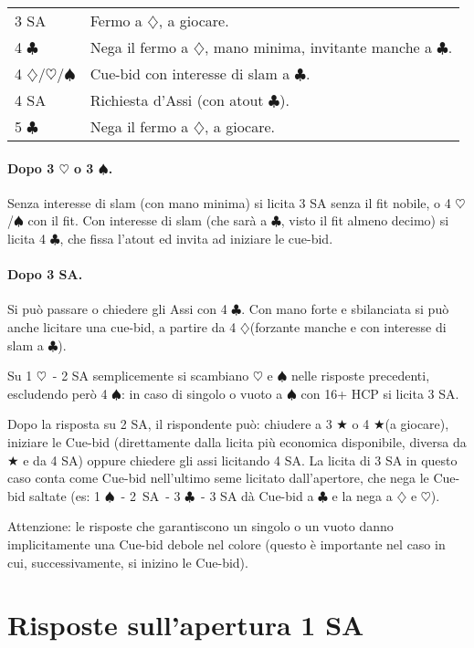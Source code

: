 \documentclass[a4paper,10pt]{article}
\renewcommand{\c}{$\clubsuit$\xspace}
\renewcommand{\d}{$\diamondsuit$\xspace}
\newcommand{\h}{$\heartsuit$\xspace}
\newcommand{\s}{$\spadesuit$\xspace}
\renewcommand{\j}{$\bigstar$\xspace}
\newcommand{\sa}{SA\xspace}
\newcommand{\smallspace}{\vskip0.3cm}
\newenvironment{twocol}
  {\smallspace\noindent\begin{tabular}{l p{0.78\textwidth}}}
  {\end{tabular}\smallspace}
\begin{document}
\begin{twocol}
	3 \sa & Fermo a \d, a giocare. \\
	4 \c & Nega il fermo a \d, mano minima, invitante manche a \c. \\
	4 \d/\h/\s & Cue-bid con interesse di slam a \c. \\
	4 \sa & Richiesta d'Assi (con atout \c). \\
	5 \c & Nega il fermo a \d, a giocare.
\end{twocol}

\paragraph{Dopo 3 \h o 3 \s.} Senza interesse di slam (con mano minima) si licita 3 \sa senza il fit nobile, o 4 \h/\s con il fit. Con interesse di slam (che sarà a \c, visto il fit almeno decimo) si licita 4 \c, che fissa l'atout ed invita ad iniziare le cue-bid.

\paragraph{Dopo 3 \sa.} Si può passare o chiedere gli Assi con 4 \c. Con mano forte e sbilanciata si può anche licitare una cue-bid, a partire da 4 \d (forzante manche e con interesse di slam a \c).

\noindent Su 1 \h\ - 2 \sa semplicemente si scambiano \h e \s nelle risposte precedenti, escludendo però 4 \s: in caso di singolo o vuoto a \s con 16+ HCP si licita 3 \sa.

Dopo la risposta su 2 \sa, il rispondente può: chiudere a 3 \j o 4 \j (a giocare), iniziare le Cue-bid (direttamente dalla licita più economica disponibile, diversa da \j e da 4 \sa) oppure chiedere gli assi licitando 4 \sa. La licita di 3 \sa in questo caso conta come Cue-bid nell'ultimo seme licitato dall'apertore, che nega le Cue-bid saltate (es: 1 \s\ - \mbox{2 \sa}\ - 3 \c\ - 3 \sa dà Cue-bid a \c e la nega a \d e \h).

Attenzione: le risposte che garantiscono un singolo o un vuoto danno implicitamente una Cue-bid debole nel colore (questo è importante nel caso in cui, successivamente, si inizino le Cue-bid).

\pagebreak

\section{Risposte sull'apertura 1 SA}
\end{document}
